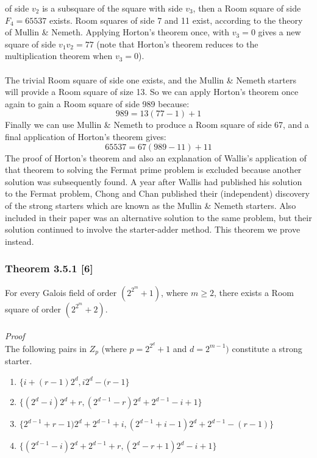 \documentclass[
  12pt,
  a4paper]{book}
\begin{document}
of side \(v_2\) is a subsquare of the square with side \(v_3\), then a Room
square of side \(F_4=65537\) exists. Room squares of side 7 and 11 exist,
according to the theory of Mullin \& Nemeth. Applying Horton's theorem
once, with \(v_3=0\) gives a new square of side \(v_1v_2=77\) (note that
Horton's theorem reduces to the multiplication theorem when \(v_3=0\)).\\
~\\
The trivial Room square of side one exists, and the Mullin \& Nemeth
starters will provide a Room square of size 13. So we can apply Horton's
theorem once again to gain a Room square of side 989 because:
\[989=13(77-1)+1\] Finally we can use Mullin \& Nemeth to produce a Room
square of side 67, and a final application of Horton's theorem gives:
\[65537=67(989-11)+11\] The proof of Horton's theorem and also an
explanation of Wallis's application of that theorem to solving the
Fermat prime problem is excluded because another solution was
subsequently found. A year after Wallis had published his solution to
the Fermat problem, Chong and Chan published their (independent)
discovery of the strong starters which are known as the Mullin \& Nemeth
starters. Also included in their paper was an alternative solution to
the same problem, but their solution continued to involve the
starter-adder method. This theorem we prove instead.

\hypertarget{theorem-3.5.1-6}{%
\subsubsection{Theorem 3.5.1 {[}6{]}}\label{theorem-3.5.1-6}}

For every Galois field of order \((2^{2^m}+1)\), where \(m \geq 2\), there
exists a Room square of order \((2^{2^m}+2)\).\\
~\\
\emph{Proof}\\
The following pairs in \(Z_p\) (where \(p=2^{2^d}+1\) and \(d=2^{m-1})\)
constitute a strong starter.

\begin{enumerate}
\def\labelenumi{\arabic{enumi}.}
\item
  \(\{i+(r-1)2^d,i2^d-(r-1\}\)
\item
  \(\{(2^d-i)2^d+r,(2^{d-1}-r)2^d+2^{d-1}-i+1\}\)
\item
  \(\{2^{d-1}+r-1)2^d+2^{d-1}+i,(2^{d-1}+i-1)2^d+2^{d-1}-(r-1)\}\)
\item
  \(\{(2^{d-1}-i)2^d+2^{d-1}+r,(2^d-r+1)2^d-i+1\}\)
\end{enumerate}
\end{document}
